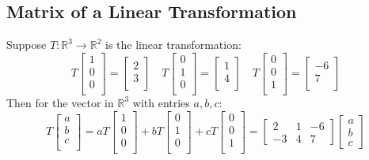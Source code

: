 \documentclass[a4paper, 9pt]{extarticle}
\begin{document}
\subsection*{Matrix of a Linear Transformation}
Suppose $T:\mathbb{R}^3 \to \mathbb{R}^2$ is the linear transformation:
$$
  T\begin{bmatrix}
    1 \\
    0 \\
    0 \\
  \end{bmatrix}
  = \begin{bmatrix}
    2 \\
    3 \\
  \end{bmatrix}
  \quad
  T\begin{bmatrix}
    0 \\
    1 \\
    0 \\
  \end{bmatrix}
  = \begin{bmatrix}
    1 \\
    4 \\
  \end{bmatrix}
  \quad
  T\begin{bmatrix}
    0 \\
    0 \\
    1 \\
  \end{bmatrix}
  = \begin{bmatrix}
    -6 \\
    7  \\
  \end{bmatrix}
$$
Then for the vector in $\mathbb{R}^3$ with entries $a,b,c$:
$$
  T\begin{bmatrix}
    a \\
    b \\
    c \\
  \end{bmatrix}
  = aT\begin{bmatrix}
    1 \\
    0 \\
    0 \\
  \end{bmatrix}
  + bT\begin{bmatrix}
    0 \\
    1 \\
    0 \\
  \end{bmatrix}
  + cT\begin{bmatrix}
    0 \\
    0 \\
    1 \\
  \end{bmatrix}
  = \begin{bmatrix}
    2  & 1 & -6 \\
    -3 & 4 & 7
  \end{bmatrix}
  \begin{bmatrix}
    a \\
    b \\
    c
  \end{bmatrix}
$$
\end{document}
